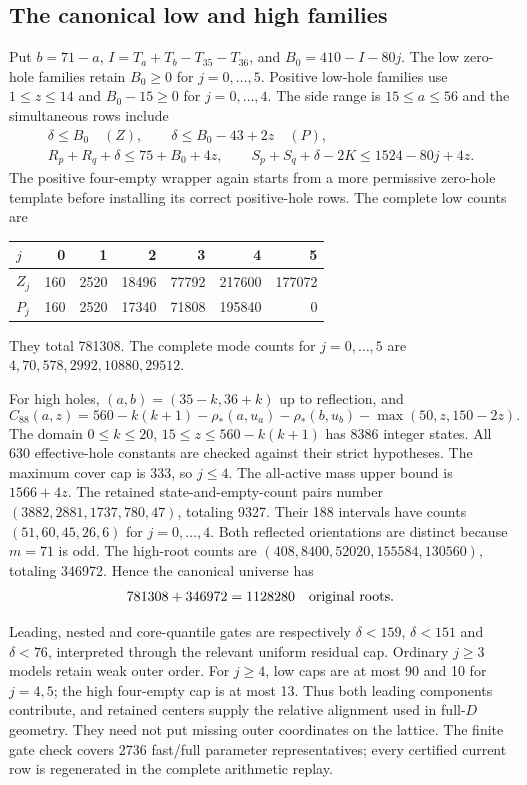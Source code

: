 \documentclass[11pt,a4paper]{article}
\theoremstyle{remark}
\begin{document}
\subsection{The canonical low and high families}
Put $b=71-a$, $I=T_a+T_b-T_{35}-T_{36}$, and
$B_0=410-I-80j$. The low zero-hole families retain $B_0\ge0$ for
$j=0,\ldots,5$. Positive low-hole families use $1\le z\le14$ and
$B_0-15\ge0$ for $j=0,\ldots,4$.
The side range is $15\le a\le56$ and the simultaneous rows include
\begin{gather*}
 \delta\le B_0\quad(Z),\qquad
 \delta\le B_0-43+2z\quad(P),\\
 R_p+R_q+\delta\le75+B_0+4z,\qquad
 S_p+S_q+\delta-2K\le1524-80j+4z.
\end{gather*}
The positive four-empty wrapper again starts from a more permissive
zero-hole template before installing its correct positive-hole rows.
The complete low counts are
\begin{center}\small
\begin{tabular}{lrrrrrr}
\toprule
$j$&0&1&2&3&4&5\\\midrule
$Z_j$&160&2520&18496&77792&217600&177072\\
$P_j$&160&2520&17340&71808&195840&0\\\bottomrule
\end{tabular}
\end{center}
They total 781308. The complete mode counts for $j=0,\ldots,5$ are
$4,70,578,2992,10880,29512$.

For high holes, $(a,b)=(35-k,36+k)$ up to reflection, and
\[
 C_{88}(a,z)=560-k(k+1)-\rho_*(a,u_a)-\rho_*(b,u_b)
                                  -\max(50,z,150-2z).
\]
The domain $0\le k\le20$, $15\le z\le560-k(k+1)$ has 8386 integer
states. All 630 effective-hole constants are checked against their
strict hypotheses. The maximum cover cap is 333, so $j\le4$.
The all-active mass upper bound is $1566+4z$.
The retained state-and-empty-count pairs number
$(3882,2881,1737,780,47)$, totaling 9327. Their 188 intervals have
counts $(51,60,45,26,6)$ for $j=0,\ldots,4$.
Both reflected orientations are distinct because $m=71$ is odd.
The high-root counts are $(408,8400,52020,155584,130560)$,
totaling 346972. Hence the canonical universe has
\[
 781308+346972=1128280\quad\hbox{original roots}.
\]

Leading, nested and core-quantile gates are respectively
$\delta<159$, $\delta<151$ and $\delta<76$, interpreted through the
relevant uniform residual cap. Ordinary $j\ge3$ models retain weak
outer order. For $j\ge4$, low caps are at most 90 and 10 for $j=4,5$;
the high four-empty cap is at most 13. Thus both leading components
contribute, and retained centers supply the relative alignment used
in full-$D$ geometry. They need not put missing outer coordinates on
the lattice. The finite gate check covers 2736 fast/full parameter
representatives; every certified current row is regenerated in the
complete arithmetic replay.
\end{document}
